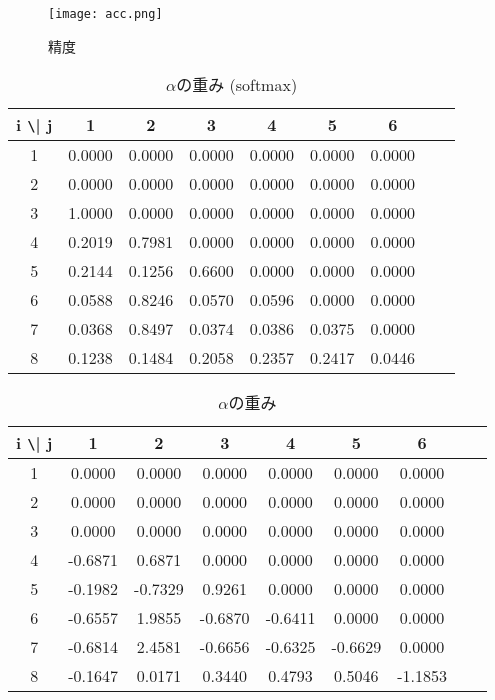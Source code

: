 \documentclass[twocolumn]{jarticle}     %
\begin{document}
\begin{figure}[tb]
	\begin{center}
		\texttt{[image: acc.png]}
		\caption{精度}
		\label{fig:acc}
	\end{center}
\end{figure}

\begin{table*}[tb]
  \begin{center}
    \caption{$\alpha$の重み (softmax)}
    \begin{tabular}{|c|c|c|c|c|c|c|c|c|} \hline
      i \verb|\| j & 1 & 2 & 3 & 4 & 5 & 6 \\ \hline
      1 & 0.0000 & 0.0000 & 0.0000 & 0.0000 & 0.0000 & 0.0000 \\ \hline
      2 & 0.0000 & 0.0000 & 0.0000 & 0.0000 & 0.0000 & 0.0000 \\ \hline
      3 & 1.0000 & 0.0000 & 0.0000 & 0.0000 & 0.0000 & 0.0000 \\ \hline
      4 & 0.2019 & 0.7981 & 0.0000 & 0.0000 & 0.0000 & 0.0000 \\ \hline
      5 & 0.2144 & 0.1256 & 0.6600 & 0.0000 & 0.0000 & 0.0000 \\ \hline
      6 & 0.0588 & 0.8246 & 0.0570 & 0.0596 & 0.0000 & 0.0000 \\ \hline
      7 & 0.0368 & 0.8497 & 0.0374 & 0.0386 & 0.0375 & 0.0000 \\ \hline
      8 & 0.1238 & 0.1484 & 0.2058 & 0.2357 & 0.2417 & 0.0446 \\ \hline
    \end{tabular}
    \label{tab:alpha_max}
  \end{center}
\end{table*}

\begin{table*}[tb]
  \begin{center}
    \caption{$\alpha$の重み}
    \begin{tabular}{|c|c|c|c|c|c|c|c|c|} \hline
      i \verb|\| j & 1 & 2 & 3 & 4 & 5 & 6 \\ \hline
      1 & 0.0000 & 0.0000 & 0.0000 & 0.0000 & 0.0000 & 0.0000 \\ \hline
      2 & 0.0000 & 0.0000 & 0.0000 & 0.0000 & 0.0000 & 0.0000 \\ \hline
      3 & 0.0000 & 0.0000 & 0.0000 & 0.0000 & 0.0000 & 0.0000 \\ \hline
      4 & -0.6871 & 0.6871 & 0.0000 & 0.0000 & 0.0000 & 0.0000 \\ \hline
      5 & -0.1982 & -0.7329 & 0.9261 & 0.0000 & 0.0000 & 0.0000 \\ \hline
      6 & -0.6557 & 1.9855 & -0.6870 & -0.6411 & 0.0000 & 0.0000 \\ \hline
      7 & -0.6814 & 2.4581 & -0.6656 & -0.6325 & -0.6629 & 0.0000 \\ \hline
      8 & -0.1647 & 0.0171 & 0.3440 & 0.4793 & 0.5046 & -1.1853 \\ \hline
    \end{tabular}
    \label{tab:alpha}
  \end{center}
\end{table*}
\end{document}
